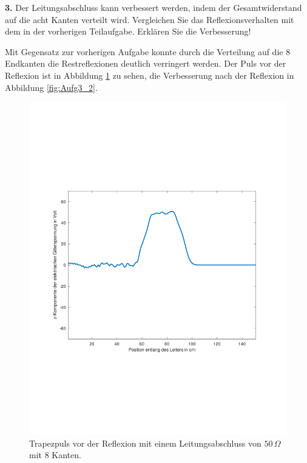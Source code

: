 \documentclass[Protokollheft.tex]{subfiles}
\begin{document}
\begin{framed}
	\noindent \textbf{3.} Der Leitungsabschluss kann verbessert werden, indem der Gesamtwiderstand 
auf die acht Kanten verteilt wird. Vergleichen Sie das Reflexionsverhalten
mit dem in der vorherigen Teilaufgabe. Erklären Sie die Verbesserung!\label{exer:distributeTermination}
\end{framed}
\noindent
Mit Gegensatz zur vorherigen Aufgabe konnte durch die Verteilung auf die 8 Endkanten die Restreflexionen deutlich verringert werden. Der Puls vor der Reflexion ist in Abbildung \ref{fig:Aufg3_1} zu sehen, die Verbesserung nach der Reflexion in Abbildung \ref{fig:Aufg3_2}.
\begin{figure}[ht]
	\centering
	\includegraphics[trim = 20mm 65mm 20mm 65mm, clip,width=0.7\linewidth]{Aufgabe3_1.pdf}
	\caption{Trapezpuls vor der Reflexion mit einem Leitungsabschluss von $50\,\Omega$ mit 8 Kanten.}\label{fig:Aufg3_1}
\end{figure}
\end{document}

